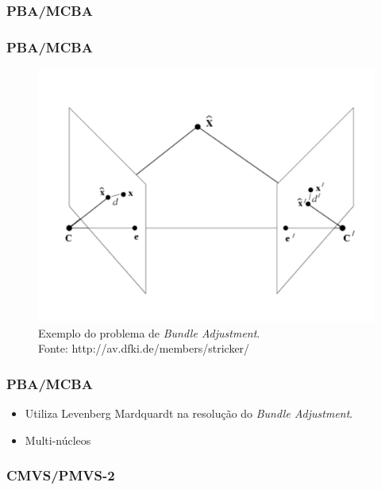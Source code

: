 \documentclass[table, usenames, svgnames, xcolor=dvipsnames]{beamer}
\begin{document}
\subsubsection{PBA/MCBA}
\begin{frame} 
\frametitle{\textbf{PBA/MCBA}}
	\begin{center}
		\begin{figure}
			\includegraphics[width=0.6\linewidth]{figs/bundleAdjustment.png}
			\caption{Exemplo do problema de \emph{Bundle Adjustment}. \\
			\tiny{Fonte: http://av.dfki.de/members/stricker/}
			}
		\end{figure}
	\end{center}
\end{frame}

\begin{frame} 
\frametitle{\textbf{PBA/MCBA}}
	\begin{center}
		\begin{itemize}
			\item Utiliza Levenberg Mardquardt na resolução do \emph{Bundle Adjustment}.
			\item Multi-núcleos
		\end{itemize}
	\end{center}
\end{frame}



\subsubsection{CMVS/PMVS-2}
\end{document}
